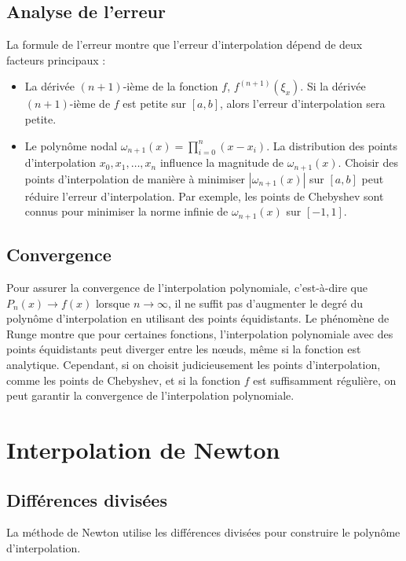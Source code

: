 \documentclass{article}
\begin{document}
\subsection{Analyse de l'erreur}

La formule de l'erreur montre que l'erreur d'interpolation dépend de deux facteurs principaux :

\begin{itemize}
    \item La dérivée $(n+1)$-ième de la fonction $f$, $f^{(n+1)}(\xi_x)$. Si la dérivée $(n+1)$-ième de $f$ est petite sur $[a, b]$, alors l'erreur d'interpolation sera petite.
    \item Le polynôme nodal $\omega_{n+1}(x) = \prod_{i=0}^{n} (x - x_i)$. La distribution des points d'interpolation $x_0, x_1, \dots, x_n$ influence la magnitude de $\omega_{n+1}(x)$. Choisir des points d'interpolation de manière à minimiser $|\omega_{n+1}(x)|$ sur $[a, b]$ peut réduire l'erreur d'interpolation. Par exemple, les points de Chebyshev sont connus pour minimiser la norme infinie de $\omega_{n+1}(x)$ sur $[-1, 1]$.
\end{itemize}

\subsection{Convergence}

Pour assurer la convergence de l'interpolation polynomiale, c'est-à-dire que $P_n(x) \to f(x)$ lorsque $n \to \infty$, il ne suffit pas d'augmenter le degré du polynôme d'interpolation en utilisant des points équidistants. Le phénomène de Runge montre que pour certaines fonctions, l'interpolation polynomiale avec des points équidistants peut diverger entre les nœuds, même si la fonction est analytique.  Cependant, si on choisit judicieusement les points d'interpolation, comme les points de Chebyshev, et si la fonction $f$ est suffisamment régulière, on peut garantir la convergence de l'interpolation polynomiale.

\section{Interpolation de Newton}

\subsection{Différences divisées}

La méthode de Newton utilise les différences divisées pour construire le polynôme d'interpolation.
\end{document}
